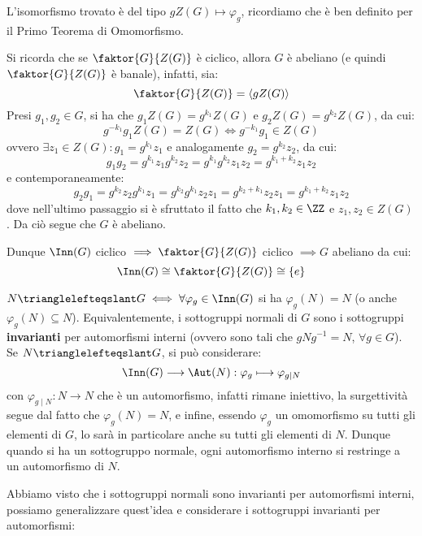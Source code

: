 \documentclass[11pt]{scrartcl}
\begin{document}
\begin{remark}
    L'isomorfismo trovato è del tipo $gZ(G) \longmapsto \varphi_g$, ricordiamo che è ben definito per il Primo Teorema di Omomorfismo.
\end{remark}

\begin{remark}
    Si ricorda che se $\faktor{G}{Z(G)}$ è ciclico, allora $G$ è abeliano (e quindi $\faktor{G}{Z(G)}$ è banale), infatti, sia:
        \[ \faktor{G}{Z(G)} = \left<gZ(G)\right>
            \]
    Presi $g_1,g_2 \in G$, si ha che $g_1Z(G) = g^{k_1}Z(G)$ e $g_2Z(G) = g^{k_2}Z(G)$, da cui:
        \[ g^{-k_1}g_1Z(G) = Z(G) \iff  g^{-k_1}g_1 \in Z(G)
            \]
    ovvero $\exists z_1 \in Z(G): g_1 = g^{k_1}z_1$ e analogamente $g_2 = g^{k_2}z_2$, da cui:
        \[ g_1g_2 = g^{k_1}z_1g^{k_2}z_2 = g^{k_1}g^{k_2}z_1z_2 = g^{k_1+k_2}z_1z_2
            \]
    e contemporaneamente:
        \[ g_2g_1 = g^{k_2}z_2g^{k_1}z_1 = g^{k_2}g^{k_1}z_2z_1 = g^{k_2 + k_1}z_2z_1 = g^{k_1+k_2}z_1z_2
            \]
    dove nell'ultimo passaggio si è sfruttato il fatto che $k_1,k_2 \in \ZZ$ e $z_1,z_2 \in Z(G)$. Da ciò segue che $G$ è abeliano.
\end{remark}

\begin{remark}
    Dunque $\Inn(G)$ ciclico $\implies \faktor{G}{Z(G)}$ ciclico $\implies G$ abeliano da cui:  
        \[ \Inn(G) \cong \faktor{G}{Z(G)} \cong \{e\}
            \]
\end{remark}

\begin{remark}
    $N \trianglelefteqslant G \iff \forall \varphi_g \in \Inn(G)$ si ha $\varphi_g(N) = N$ (o anche $\varphi_g(N) \subseteq N$). Equivalentemente, i sottogruppi
    normali di $G$ sono i sottogruppi \textbf{invarianti} per automorfismi interni (ovvero sono tali che $gNg^{-1} = N$, $\forall g \in G$). Se $N \trianglelefteqslant G$, si può considerare:
        \[ \Inn(G) \longrightarrow \Aut(N) : \varphi_g \longmapsto \varphi_{g \mid N}
            \]
    con $\varphi_{g \mid N} : N \longrightarrow N$ che è un automorfismo, infatti rimane iniettivo, la surgettività segue dal fatto che $\varphi_g(N) = N$, e infine, essendo $\varphi_g$ 
    un omomorfismo su tutti gli elementi di $G$, lo sarà in particolare anche su tutti gli elementi di $N$. Dunque quando si ha un sottogruppo normale, ogni automorfismo interno si restringe
    a un automorfismo di $N$.
\end{remark}

Abbiamo visto che i sottogruppi normali sono invarianti per automorfismi interni, possiamo generalizzare quest'idea e considerare i sottogruppi invarianti per automorfismi:
\end{document}
